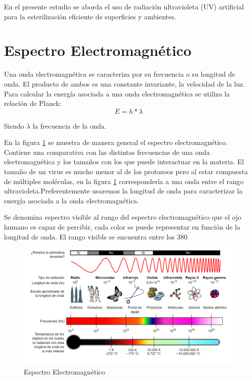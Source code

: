 \documentclass[letterpaper,11pt]{article}
\begin{document}
En el presente estudio se aborda el uso de radiación ultravioleta (UV) artificial para la esterilización eficiente de superficies y ambientes.

\section{Espectro Electromagnético}  

Una onda electromagnética se caracteriza por su frecuencia o su longitud de onda. El producto de ambos es una constante invariante, la velocidad de la luz. Para calcular la energía asociada a una onda electromagnética se utiliza la relación de Planck:
\begin{equation}
E= h * \lambda
\label{plank}
\end{equation}

Siendo $\lambda$ la frecuencia de la onda.

En la figura \ref{espectro} se muestra de manera general el espectro electromagnético. Contiene una comparativa con las distintas frecuencias de una onda electromagnética y los tamaños con los que puede interactuar en la materia. 
El tamaño de un virus es mucho menor al de los protozoos pero al estar compuesta de múltiples moléculas, en la figura \ref{espectro} correspondería a una onda entre el rango ultravioleta.Preferentemente usaremos la longitud de onda para caracterizar la energía asociada a la onda electromagnética. 

Se denomina espectro visible al rango del espectro electromagnético que el ojo humano es capaz de percibir, cada color se puede representar en función de la longitud de onda. El rango visible se encuentra entre los 380  

\begin{figure}[hbt!]
\includegraphics[width=\textwidth,scale=0.3]{espectro.png}
\caption{Espectro Electromagnético}
\label{espectro}
\end{figure}




\end{document}
